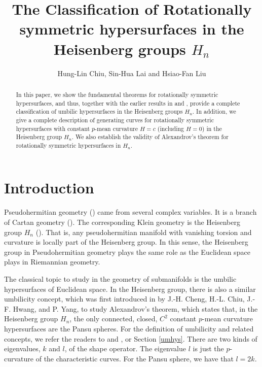 \documentclass[12pt]{amsart}
\theoremstyle{definition}\newtheorem{exa}[thm]{\sc Example}
\theoremstyle{definition}\newtheorem{de}[thm]{\sc Definition}
\theoremstyle{definition}\newtheorem{rem}[thm]{\sc Remark}
\theoremstyle{definition}\newtheorem{prob}[thm]{\it Problem}
\theoremstyle{definition}\newtheorem{fact}[thm]{\sc Fact}
\theoremstyle{definition}\newtheorem{claim}[thm]{\sc Claim}
\numberwithin{equation}{section}
\begin{document}
\title[sample]{The Classification of Rotationally symmetric hypersurfaces in the Heisenberg groups $H_{n}$}
\author{Hung-Lin Chiu, Sin-Hua Lai and Hsiao-Fan Liu}
\address{Department of Mathematics, National Tsing Hua University, Hsinchu, Taiwan 300, R.O.C.; and National Center for Theoretical Sciences, Taipei, Taiwan}
\address{Fundamental Education Center, National Chin-Yi University of
Technology,Taichung 41170, Taiwan, R.O.C.}
\address{Department of Applied Mathematics, National Chung Hsing University, Taichung,Taiwan, R.O.C.}



\begin{abstract}
 In this paper, we show the fundamental theorems for rotationally symmetric hypersurfaces, and thus, together with the earlier results in \cite{CCHY1} and \cite{CCHY2}, provide a complete classification of umbilic hypersurfaces in the Heisenberg groups $H_{n}$. In addition, we  give a complete description of generating curves for rotationally symmetric hypersurfaces with constant $p$-mean curvature $H=c$ (including $H=0$) in the Heisenberg group $H_{n}$.
We also establish the validity of Alexandrov's theorem for rotationally symmetric hypersurfaces in $H_n$.   
\end{abstract}

\maketitle
\tableofcontents
\section{Introduction}
Pseudohermitian geometry (\cite{DT,J,W,Y}) came from several complex variables. It is a branch of Cartan geometry (\cite{PT,S}). The corresponding Klein geometry is the Heisenberg group $H_{n}$ (\cite{CCHY1,CCHY2,CFH,CL,CHL}). That is, any pseudohermitian manifold with vanishing torsion and curvature is locally part of the Heisenberg group. In this sense, the Heisenberg group in Pseudohermitian geometry plays the same role as the Euclidean space plays in Riemannian geometry. 

The classical topic to study in the geometry of submanifolds is the umbilic hypersurfaces of Euclidean space. In the Heisenberg group, there is also a similar umbilicity concept, which was first introduced in \cite{CCHY1} by J.-H. Cheng, H.-L. Chiu, J.-F. Hwang, and P. Yang,  to study Alexandrov's theorem, which states that, in the Heisenberg group $H_{n}$, the only connected, closed, $C^2$ constant $p$-mean curvature hypersurfaces are the Pansu spheres. For the definition of umbilicity and related concepts, we refer the readers to \cite{CCHY1} and \cite{CCHY2}, or Section \ref{umhys}. There are two kinds of eigenvalues, $k$ and $l$, of the shape operator. The eigenvalue $l$ is just the $p$-curvature of the characteristic curves. For the Pansu sphere, we have that $l=2k$. 
\end{document}
